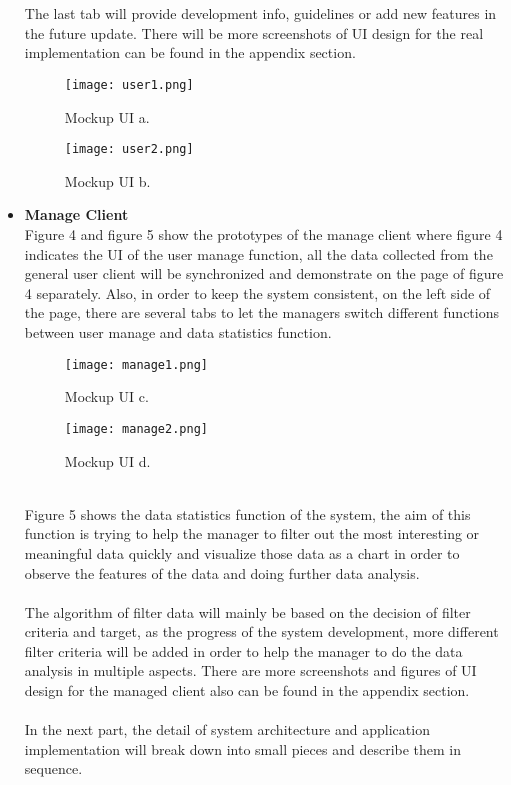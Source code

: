 \documentclass[12pt]{article}
\begin{document}
\begin{itemize}
\\
\\The last tab will provide development info, guidelines or add new features in the future update. There will be more screenshots of UI design for the real implementation can be found in the appendix section.
\\
\begin{figure}[ht]
\begin{minipage}[t]{0.45\textwidth}
\centering
\texttt{[image: user1.png]}
\caption{Mockup UI a.\label{fig:1}}
\end{minipage}
\qquad
\begin{minipage}[t]{0.45\textwidth}
\centering
\texttt{[image: user2.png]}
\caption{Mockup UI b.\label{fig:2}}
\end{minipage}
\end{figure}
\item\textbf{Manage Client}
\\Figure 4 and figure 5 show the prototypes of the manage client where figure 4 indicates the UI of the user manage function, all the data collected from the general user client will be synchronized and demonstrate on the page of figure 4 separately. Also, in order to keep the system consistent, on the left side of the page, there are several tabs to let the managers switch different functions between user manage and data statistics function.
\begin{figure}[ht]
\begin{minipage}[t]{0.45\textwidth}
\centering
\texttt{[image: manage1.png]}
\caption{Mockup UI c.\label{fig:1}}
\end{minipage}
\qquad
\begin{minipage}[t]{0.45\textwidth}
\centering
\texttt{[image: manage2.png]}
\caption{Mockup UI d.\label{fig:2}}
\end{minipage}
\end{figure}
\\Figure 5 shows the data statistics function of the system, the aim of this function is trying to help the manager to filter out the most interesting or meaningful data quickly and visualize those data as a chart in order to observe the features of the data and doing further data analysis. 
\\
\\The algorithm of filter data will mainly be based on the decision of filter criteria and target, as the progress of the system development, more different filter criteria will be added in order to help the manager to do the data analysis in multiple aspects. There are more screenshots and figures of UI design for the managed client also can be found in the appendix section.
\\
\\In the next part, the detail of system architecture and application implementation will break down into small pieces and describe them in sequence.
\end{itemize}
\end{document}
